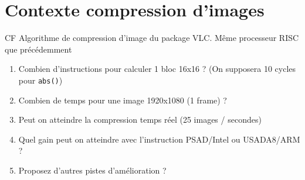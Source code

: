 \documentclass{article}
\begin{document}
\section{Contexte compression d'images}




CF Algorithme de compression d'image du package VLC. Même processeur
RISC que précédemment
\begin{enumerate}
\item Combien d'instructions pour calculer 1 bloc 16x16 ? (On
  supposera 10 cycles pour \texttt{abs()})
\item Combien de temps pour une image 1920x1080 (1 frame) ? 
\item Peut on atteindre la compression temps réel (25 images /
  secondes)
\item Quel gain peut on atteindre avec l'instruction PSAD/Intel ou
  USADA8/ARM ?
\item Proposez d'autres pistes d'amélioration ?
\end{enumerate}
\end{document}
